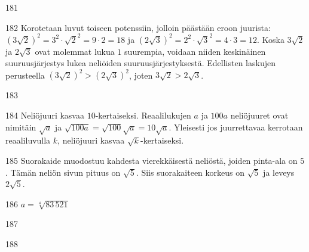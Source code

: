 \begin{Vastaus}{181}
	
\end{Vastaus}
\begin{Vastaus}{182}
Korotetaan luvut toiseen potenssiin, jolloin päästään eroon juurista: $(3\sqrt{2})^2=3^2\cdot\sqrt{2}^2=9 \cdot 2=18$ ja $(2\sqrt{3})^2=2^2\cdot\sqrt{3}^2=4 \cdot 3=12$. Koska $3\sqrt{2}$ ja $2\sqrt{3}$ ovat molemmat lukua $1$ suurempia, voidaan niiden keskinäinen suuruusjärjestys lukea neliöiden suuruusjärjestyksestä. Edellisten laskujen perusteella $(3\sqrt{2})^2 > (2\sqrt{3})^2$, joten $3\sqrt{2} > 2\sqrt{3}$.
        
\end{Vastaus}
\begin{Vastaus}{183}
\end{Vastaus}
\begin{Vastaus}{184}
Neliöjuuri kasvaa $10$-kertaiseksi. Reaalilukujen $a$ ja $100a$ neliöjuuret ovat nimitäin $\sqrt{a}$ ja $\sqrt{100a}=\sqrt{100}\sqrt{a}=10\sqrt{a}$. Yleisesti jos juurrettavaa kerrotaan reaaliluvulla $k$, neliöjuuri kasvaa $\sqrt{k}$-kertaiseksi.
        
\end{Vastaus}
\begin{Vastaus}{185}
Suorakaide muodostuu kahdesta vierekkäisestä neliöstä, joiden pinta-ala on $5$. Tämän neliön sivun pituus on $\sqrt{5}$. Siis suorakaiteen korkeus on $\sqrt{5}$ ja leveys $2\sqrt{5}$.
\end{Vastaus}
\begin{Vastaus}{186}
$a=\sqrt[4]{83\,521}$
	
\end{Vastaus}
\begin{Vastaus}{187}
	
\end{Vastaus}
\begin{Vastaus}{188}
	
\end{Vastaus}
